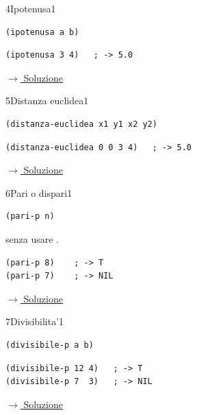 \label{ex:4}
\begin{essbox}{4}{Ipotenusa}{1}
\nopagebreak
\begin{lstlisting}
(ipotenusa a b)
\end{lstlisting}
\begin{lstlisting}
(ipotenusa 3 4)   ; -> 5.0
\end{lstlisting}


\small\color{black!55}\hyperref[sol:4]{$\rightarrow$ Soluzione}\normalsize\color{black}
\end{essbox}

\label{ex:5}
\begin{colbox}{5}{Distanza euclidea}{1}
\nopagebreak
\begin{lstlisting}
(distanza-euclidea x1 y1 x2 y2)
\end{lstlisting}
\begin{lstlisting}
(distanza-euclidea 0 0 3 4)   ; -> 5.0
\end{lstlisting}


\small\color{black!55}\hyperref[sol:5]{$\rightarrow$ Soluzione}\normalsize\color{black}
\end{colbox}

\label{ex:6}
\begin{essbox}{6}{Pari o dispari}{1}
\nopagebreak
\begin{lstlisting}
(pari-p n)
\end{lstlisting}
senza usare .
\begin{lstlisting}
(pari-p 8)    ; -> T
(pari-p 7)    ; -> NIL
\end{lstlisting}


\small\color{black!55}\hyperref[sol:6]{$\rightarrow$ Soluzione}\normalsize\color{black}
\end{essbox}

\label{ex:7}
\begin{colbox}{7}{Divisibilita'}{1}
\nopagebreak
\begin{lstlisting}
(divisibile-p a b)
\end{lstlisting}
\begin{lstlisting}
(divisibile-p 12 4)   ; -> T
(divisibile-p 7  3)   ; -> NIL
\end{lstlisting}


\small\color{black!55}\hyperref[sol:7]{$\rightarrow$ Soluzione}\normalsize\color{black}
\end{colbox}

